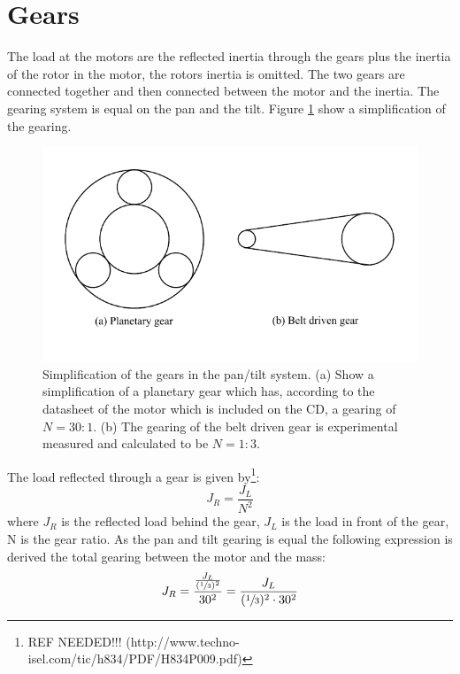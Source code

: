 \section{Gears}
The load at the motors are the reflected inertia through the gears plus the inertia of the rotor in the motor, the rotors inertia is omitted. The two gears are connected together and then connected between the motor and the inertia. The gearing system is equal on the pan and the tilt. Figure \ref{fig:app_gears} show a simplification of the gearing.
\begin{figure}[htb]
	\centering
	\includegraphics[scale=1,trim=0 0 0 0]{graphics/gears.pdf} %
	\caption{Simplification of the gears in the pan/tilt system. (a) Show a simplification of a planetary gear which has, according to the datasheet of the motor which is included on the CD, a gearing of $N = 30:1$. (b) The gearing of the belt driven gear is experimental measured and calculated to be $N = 1:3$.}
	\label{fig:app_gears}			%
\end{figure}
The load reflected through a gear is given by\footnote{REF NEEDED!!!   (http://www.techno-isel.com/tic/h834/PDF/H834P009.pdf)}:
\begin{equation}
	J_R = \frac{J_L}{N^{2}}
\end{equation}
where $J_R$ is the reflected load behind the gear, $J_L$ is the load in front of the gear, N is the gear ratio. As the pan and tilt gearing is equal the following expression is derived the total gearing between the motor and the mass:
\begin{equation}
	J_R = \frac{\frac{J_L}{(\sfrac{1}{3})^{2}}}{30^{2}} = \frac{J_L}{(\sfrac{1}{3})^{2} \cdot 30^{2}}\label{app:eq_reflected_inertia_temp}
\end{equation}

